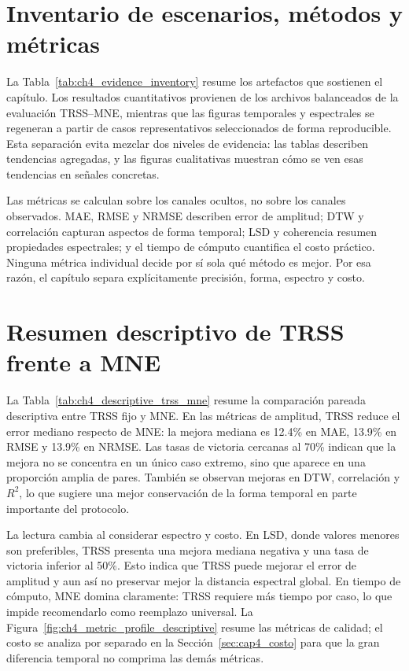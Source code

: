 \section{Inventario de escenarios, métodos y métricas}

La Tabla~\ref{tab:ch4_evidence_inventory} resume los artefactos que sostienen el capítulo. Los resultados cuantitativos provienen de los archivos balanceados de la evaluación TRSS--MNE, mientras que las figuras temporales y espectrales se regeneran a partir de casos representativos seleccionados de forma reproducible. Esta separación evita mezclar dos niveles de evidencia: las tablas describen tendencias agregadas, y las figuras cualitativas muestran cómo se ven esas tendencias en señales concretas.



Las métricas se calculan sobre los canales ocultos, no sobre los canales observados. MAE, RMSE y NRMSE describen error de amplitud; DTW y correlación capturan aspectos de forma temporal; LSD y coherencia resumen propiedades espectrales; y el tiempo de cómputo cuantifica el costo práctico. Ninguna métrica individual decide por sí sola qué método es mejor. Por esa razón, el capítulo separa explícitamente precisión, forma, espectro y costo.

\section{Resumen descriptivo de TRSS frente a MNE}

La Tabla~\ref{tab:ch4_descriptive_trss_mne} resume la comparación pareada descriptiva entre TRSS fijo y MNE. En las métricas de amplitud, TRSS reduce el error mediano respecto de MNE: la mejora mediana es 12.4\% en MAE, 13.9\% en RMSE y 13.9\% en NRMSE. Las tasas de victoria cercanas al 70\% indican que la mejora no se concentra en un único caso extremo, sino que aparece en una proporción amplia de pares. También se observan mejoras en DTW, correlación y $R^2$, lo que sugiere una mejor conservación de la forma temporal en parte importante del protocolo.



La lectura cambia al considerar espectro y costo. En LSD, donde valores menores son preferibles, TRSS presenta una mejora mediana negativa y una tasa de victoria inferior al 50\%. Esto indica que TRSS puede mejorar el error de amplitud y aun así no preservar mejor la distancia espectral global. En tiempo de cómputo, MNE domina claramente: TRSS requiere más tiempo por caso, lo que impide recomendarlo como reemplazo universal. La Figura~\ref{fig:ch4_metric_profile_descriptive} resume las métricas de calidad; el costo se analiza por separado en la Sección~\ref{sec:cap4_costo} para que la gran diferencia temporal no comprima las demás métricas.

